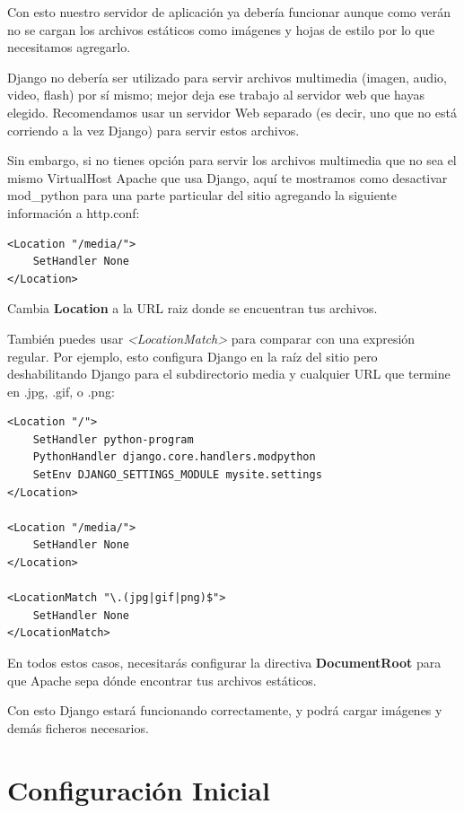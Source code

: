 Con esto nuestro servidor de aplicación ya debería funcionar aunque como verán no se cargan los archivos estáticos como imágenes y hojas de estilo por lo que necesitamos agregarlo.

Django no debería ser utilizado para servir archivos multimedia (imagen, audio, video, flash) por sí mismo; mejor deja ese trabajo al servidor web que hayas elegido. Recomendamos usar un servidor Web separado (es decir, uno que no está corriendo a la vez Django) para servir estos archivos. 

Sin embargo, si no tienes opción para servir los archivos multimedia que no sea el mismo VirtualHost Apache que usa Django, aquí te mostramos como desactivar mod\_python para una parte particular del sitio agregando la siguiente información a http.conf:

\begin{lstlisting}[style=consola]
<Location "/media/">
    SetHandler None
</Location>
\end{lstlisting}
\vspace{0.1cm}

Cambia \textbf{Location} a la URL raiz donde se encuentran tus archivos.

También puedes usar \textit{<LocationMatch>} para comparar con una expresión regular. Por ejemplo, esto configura Django en la raíz del sitio pero deshabilitando Django para el subdirectorio media y cualquier URL que termine en .jpg, .gif, o .png:

\begin{lstlisting}[style=consola]
<Location "/">
    SetHandler python-program
    PythonHandler django.core.handlers.modpython
    SetEnv DJANGO_SETTINGS_MODULE mysite.settings
</Location>

<Location "/media/">
    SetHandler None
</Location>

<LocationMatch "\.(jpg|gif|png)$">
    SetHandler None
</LocationMatch>
\end{lstlisting}
\vspace{0.1cm}

En todos estos casos, necesitarás configurar la directiva \textbf{DocumentRoot} para que Apache sepa dónde encontrar tus archivos estáticos.

Con esto Django estará funcionando correctamente, y podrá cargar imágenes y demás ficheros necesarios.


\section{Configuración Inicial}


